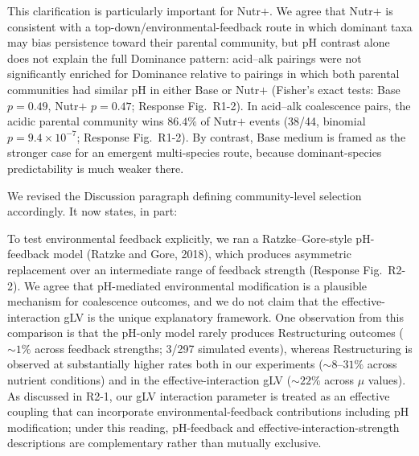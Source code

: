 This clarification is particularly important for Nutr$+$. We agree that Nutr$+$ is consistent with a top-down/environmental-feedback route in which dominant taxa may bias persistence toward their parental community, but pH contrast alone does not explain the full Dominance pattern: acid--alk pairings were not significantly enriched for Dominance relative to pairings in which both parental communities had similar pH in either Base or Nutr$+$ (Fisher's exact tests: Base $p = 0.49$, Nutr$+$ $p = 0.47$; Response Fig.~R1-2). In acid--alk coalescence pairs, the acidic parental community wins $86.4\%$ of Nutr$+$ events (38/44, binomial $p = 9.4 \times 10^{-7}$; Response Fig.~R1-2). By contrast, Base medium is framed as the stronger case for an emergent multi-species route, because dominant-species predictability is much weaker there.

We revised the Discussion paragraph defining community-level selection accordingly. It now states, in part: 

To test environmental feedback explicitly, we ran a Ratzke--Gore-style pH-feedback model (Ratzke and Gore, 2018), which produces asymmetric replacement over an intermediate range of feedback strength (Response Fig.~R2-2). We agree that pH-mediated environmental modification is a plausible mechanism for coalescence outcomes, and we do not claim that the effective-interaction gLV is the unique explanatory framework. One observation from this comparison is that the pH-only model rarely produces Restructuring outcomes ($\sim 1\%$ across feedback strengths; 3/297 simulated events), whereas Restructuring is observed at substantially higher rates both in our experiments ($\sim 8\text{--}31\%$ across nutrient conditions) and in the effective-interaction gLV ($\sim 22\%$ across $\mu$ values). As discussed in R2-1, our gLV interaction parameter is treated as an effective coupling that can incorporate environmental-feedback contributions including pH modification; under this reading, pH-feedback and effective-interaction-strength descriptions are complementary rather than mutually exclusive.

